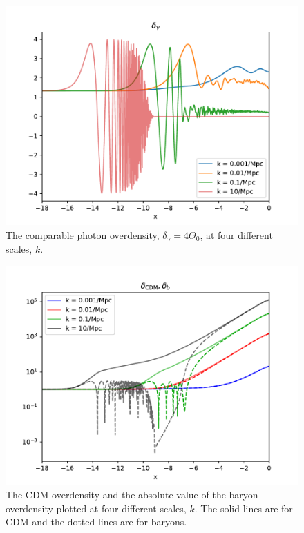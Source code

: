 \documentclass{aa}
\begin{document}
\begin{figure}[h!]
   \includegraphics[scale=0.6]{../figures/milestone3/delta_gamma.pdf}
   \caption{The comparable photon overdensity, $\delta_\gamma = 4\Theta_0$, at four different scales, $k$. }\label{fig:delta_gamma}
\end{figure}

\begin{figure}[h!]
   \includegraphics[scale=0.6]{../figures/milestone3/delta_cdm_delta_b.pdf}
   \caption{The CDM overdensity and the absolute value of the baryon overdensity plotted at four different scales, $k$. The solid lines are for CDM and the dotted lines are for baryons.}\label{fig:delta_cdm_delta_b}
\end{figure}
\end{document}
